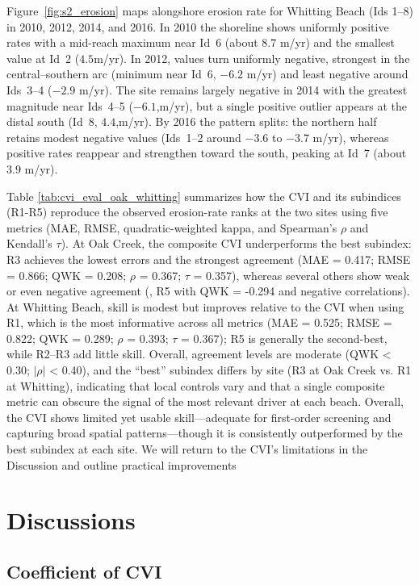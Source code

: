 Figure~\ref{fig:s2_erosion} maps alongshore erosion rate for Whitting Beach (Ids
1–8) in 2010, 2012, 2014, and 2016. In 2010 the shoreline shows uniformly
positive rates with a mid-reach maximum near Id~6 (about $8.7$ m/yr) and the
smallest value at Id~2 ($4.5$m/yr). In 2012, values turn uniformly negative,
strongest in the central–southern arc (minimum near Id~6, $-6.2$ m/yr) and least
negative around Ids~3–4 ($-2.9$ m/yr). The site remains largely negative in 2014
with the greatest magnitude near Ids~4–5 ($-6.1$,m/yr), but a single positive
outlier appears at the distal south (Id~8, $4.4$,m/yr). By 2016 the pattern
splits: the northern half retains modest negative values (Ids~1–2 around $-3.6$
to $-3.7$ m/yr), whereas positive rates reappear and strengthen toward the
south, peaking at Id~7 (about $3.9$ m/yr).



Table \ref{tab:cvi_eval_oak_whitting} summarizes how the CVI and its subindices
(R1-R5) reproduce the observed erosion-rate ranks at the two sites using five
metrics (MAE, RMSE, quadratic-weighted kappa, and Spearman’s $\rho$ and
Kendall’s $\tau$).  At Oak Creek, the composite CVI underperforms the best
subindex: R3 achieves the lowest errors and the strongest agreement (MAE =
0.417; RMSE = 0.866; QWK = 0.208; $\rho$ = 0.367; $\tau$ = 0.357), whereas
several others show weak or even negative agreement (\eg, R5 with QWK = -0.294
and negative correlations). At Whitting Beach, skill is modest but improves
relative to the CVI when using R1, which is the most informative across all
metrics (MAE = 0.525; RMSE = 0.822; QWK = 0.289; $\rho$ = 0.393; $\tau$ =
0.367); R5 is generally the second-best, while R2–R3 add little skill. Overall,
agreement levels are moderate (QWK < 0.30; $|\rho|$ < 0.40), and the “best”
subindex differs by site (R3 at Oak Creek vs. R1 at Whitting), indicating that
local controls vary and that a single composite metric can obscure the signal of
the most relevant driver at each beach. Overall, the CVI shows limited yet
usable skill—adequate for first-order screening and capturing broad spatial
patterns—though it is consistently outperformed by the best subindex at each
site. We will return to the CVI’s limitations in the Discussion and outline
practical improvements
\section{Discussions}
\label{c5_Discussions}

\subsection{Coefficient of CVI}
\label{Coefficient of CVI}


